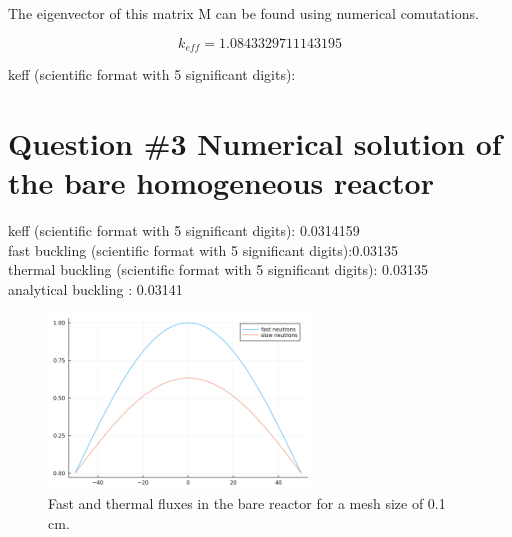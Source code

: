 \documentclass[11pt,a4paper]{article}
\begin{document}
The eigenvector of this matrix M can be found using numerical comutations. 




\begin{equation}
	k_{eff}=1.0843329711143195
\end{equation}


keff (scientific format with 5 significant digits): \\

\section{Question \#3 Numerical solution of the bare homogeneous reactor}



keff (scientific format with 5 significant digits): 0.0314159\\

fast buckling (scientific format with 5 significant digits):0.03135 \\

thermal buckling (scientific format with 5 significant digits): 0.03135\\

analytical buckling : 0.03141

\begin{figure}[h]
	\includegraphics[width=7cm]{../../figs/ex3/bare.png}
	\centering
	\caption{Fast and thermal fluxes in the bare reactor for a mesh size of 0.1 cm.}
\end{figure}
\end{document}
